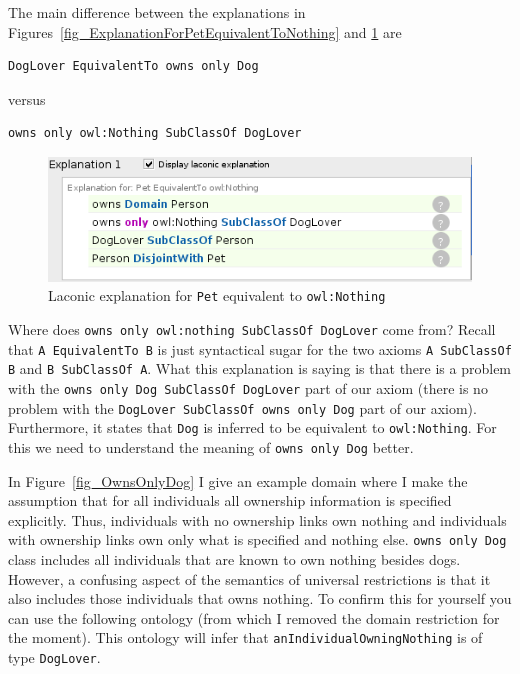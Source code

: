 \documentclass{amsart}
\begin{document}
The main difference between the explanations in Figures~\ref{fig_ExplanationForPetEquivalentToNothing} and \ref{fig_LaconicExplanationForPetEquivalentToNothing} are 

\begin{small}
\begin{verbatim} 
DogLover EquivalentTo owns only Dog
\end{verbatim}
\end{small}

versus

\begin{small}
\begin{verbatim} 
owns only owl:Nothing SubClassOf DogLover
\end{verbatim}
\end{small}

    \begin{figure}
      \centering \includegraphics[trim = 0mm 0mm 0mm 0mm, clip, scale=0.65]{./LaconicExplanationForPetEquivalentToNothing.png}
      \caption{Laconic explanation for \texttt{Pet} equivalent to \texttt{owl:Nothing}}\label{fig_LaconicExplanationForPetEquivalentToNothing}
    \end{figure}


Where does \texttt{owns only owl:nothing SubClassOf DogLover} come from? Recall that \texttt{A EquivalentTo B} is just syntactical sugar for the two axioms \texttt{A SubClassOf B} and \texttt{B SubClassOf A}. What this explanation is saying is that there is a problem with the \texttt{owns only Dog SubClassOf DogLover} part of our axiom (there is no problem with the \texttt{DogLover SubClassOf owns only Dog} part of our axiom). Furthermore, it states that \texttt{Dog} is inferred to be equivalent to \texttt{owl:Nothing}. For this we need to understand the meaning of \texttt{owns only Dog} better. 

In Figure~\ref{fig_OwnsOnlyDog} I give an example domain where I make the assumption that for all individuals all ownership information is specified explicitly. Thus, individuals with no ownership links own nothing and individuals with ownership links own only what is specified and nothing else. \texttt{owns only Dog} class includes all individuals that are known to own nothing besides dogs. However, a confusing aspect of the semantics of universal restrictions is that it also includes those individuals that owns nothing. To confirm this for yourself you can use the following ontology (from which I removed the domain restriction for the moment). This ontology will infer that \texttt{anIndividualOwningNothing} is of type \texttt{DogLover}.
\end{document}
